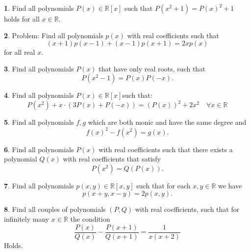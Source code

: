 \documentclass{article}
\theoremstyle{definition}
\newtheorem{p}{}
\begin{document}
\begin{p}
Find all polynomials $P(x) \in \mathbb{R}[x]$ such that $P(x^2+1)=P(x)^2+1$ holds for all $x \in \mathbb{R}$.
\end{p}





\begin{p}
Problem: Find all polynomials $p(x)$ with real coefficients such that
\[ (x+1)p(x-1) + (x-1)p(x+1) = 2x p(x)  \]
for all real $x$.
\end{p}





\begin{p}
Find all polynomials $P(x)$ that have only real roots, such that \[ P(x^2-1)=P(x)P(-x). \]
\end{p}





\begin{p}
Find all polynomials $P(x) \in \mathbb R[x]$such that:
\[P(x^2)+x \cdot (3P(x)+P(-x))=(P(x))^2+2x^2 \quad  \forall x\in  \mathbb R\]
\end{p}





\begin{p}
Find all polynomials $f,g$ which are both monic and have the same degree and
\[f(x)^2-f(x^2)=g(x).\]
\end{p}





\begin{p}
Find all polynomials $P(x)$ with real coefficients such that there exists a polynomial $Q(x)$ with real coefficients that satisfy 
\[P(x^2)=Q(P(x)).\]
\end{p}





\begin{p}
Find all polynomials $p(x,y)\in\mathbb R[x,y]$ such that for each $x,y\in\mathbb R$ we have
\[ p(x+y,x-y)=2p(x,y). \]
\end{p}





\begin{p}
Find all couples of polynomials $(P,Q)$ with real coefficients, such that for infinitely many $x\in\mathbb R$ the condition \[ \frac{P(x)}{Q(x)}-\frac{P(x+1)}{Q(x+1)}=\frac{1}{x(x+2)}\]
Holds.
\end{p}
\end{document}
